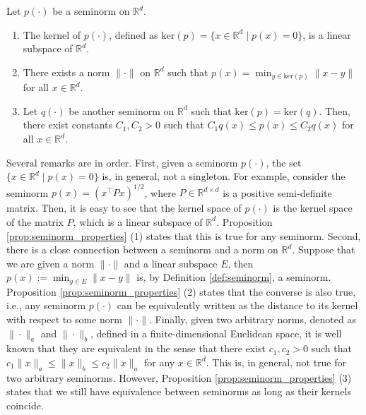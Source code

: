 \documentclass[11 pt]{article}
\begin{document}
	\begin{proposition}\label{prop:seminorm_properties}
		Let $p(\cdot)$ be a seminorm on $\mathbb{R}^d$.
		\begin{enumerate}[(1)]
			\item The kernel of $p(\cdot)$, defined as $\text{ker}(p) = \{x \in \mathbb{R}^d \mid p(x)=0\}$, is a linear subspace of $\mathbb{R}^d$.
			\item There exists a norm $\| \cdot \|$ on $\mathbb{R}^d$ such that $p(x) = \min_{y \in \text{ker}(p)} \| x - y \|$ for all $x \in \mathbb{R}^d$.
			\item Let $q(\cdot)$ be another seminorm on $\mathbb{R}^d$ such that $\text{ker}(p)=\text{ker}(q)$. Then, there exist constants $C_1,C_2>0$ such that $C_1 q(x) \leq p(x)  \leq C_2 q(x)$ for all $x \in \mathbb{R}^d$.
		\end{enumerate}
	\end{proposition}
	
	Several remarks are in order. First, given a seminorm $p(\cdot)$, the set $\{x\in \mathbb{R}^d \mid p(x)=0\}$ is, in general, not a singleton. For example, consider the seminorm $p(x)=(x^\top Px)^{1/2}$, where $P\in\mathbb{R}^{d\times d}$ is a positive semi-definite matrix. Then, it is easy to see that the kernel space of $p(\cdot)$ is the kernel space of the matrix $P$, which is a linear subspace of $\mathbb{R}^d$. Proposition \ref{prop:seminorm_properties} (1) states that this is true for any seminorm.
	Second, there is a close connection between a seminorm and a norm on $\mathbb{R}^d$. Suppose that we are given a norm $\| \cdot \|$ and a linear subspace $E$, then $p(x):=\min_{y \in E} \| x - y \|$ is, by Definition \ref{def:seminorm}, a seminorm.
	Proposition \ref{prop:seminorm_properties} (2) states that the converse is also true, i.e., any seminorm $p(\cdot)$ can be equivalently written as the distance to its kernel with respect to some norm $\| \cdot \|$. Finally, given two arbitrary norms, denoted as $\|\cdot\|_a$ and $\|\cdot\|_b$, defined in a finite-dimensional Euclidean space, it is well known that they are equivalent in the sense that there exist $c_1,c_2>0$ such that $c_1\|x\|_a\leq \|x\|_b\leq c_2\|x\|_a$ for any $x\in\mathbb{R}^d$. This is, in general, not true for two arbitrary seminorms. However, Proposition \ref{prop:seminorm_properties} (3) states that we still have equivalence between seminorms as long as their kernels coincide.
	
\end{document}
